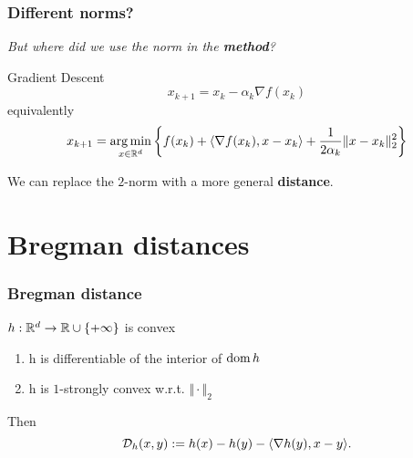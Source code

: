 \documentclass{beamer}
\begin{document}
\begin{frame}
  \frametitle{Different norms?}
  \begin{center}
    \textit{But where did we use the norm in the \textbf{method}?}
  \end{center}


  \begin{block}{Gradient Descent}
    \begin{equation}
      x_{k+1} = x_k - \alpha_k \nabla f(x_k)
    \end{equation}
    equivalently
    \begin{equation}
      x_{k+1} = \operatorname*{arg\,min}_{x \in \mathbb{R}^d} \left\{ f(x_k) + \langle \nabla f(x_k), x-x_k \rangle + \frac{1}{2 \alpha_k} \Vert x-x_k  \Vert_2^2 \right\}
    \end{equation}
  \end{block}
  We can replace the $2$-norm with a more general \textbf{distance}.
\end{frame}


\section{Bregman distances}%

\begin{frame}
  \frametitle{Bregman distance}
  $h: \mathbb{R}^d \to \mathbb{R} \cup \{+\infty\}$ is convex
  \begin{enumerate}
    \item h is differentiable of the interior of $\operatorname*{dom} h$
    \item h is $1$-strongly convex w.r.t. $\Vert \cdot \Vert_2$
  \end{enumerate}
  Then
  \begin{equation}
    \mathcal{D}_h(x,y) := h(x) - h(y) - \langle \nabla h(y), x-y \rangle.
  \end{equation}

\end{frame}
\end{document}
